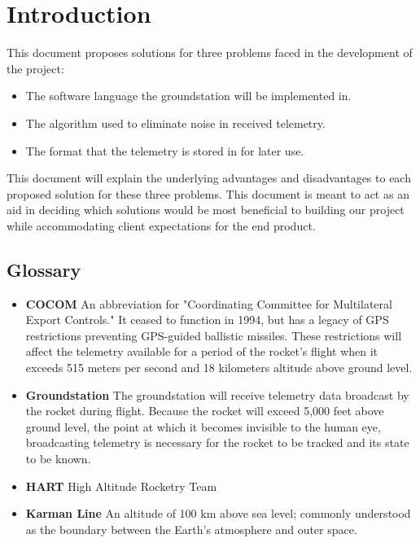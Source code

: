 \documentclass[onecolumn, draftclsnofoot,10pt, compsoc]{IEEEtran}
\begin{document}
	\newpage
	\tableofcontents
	\newpage


	\section{Introduction}
		\noindent
		This document proposes solutions for three problems faced in the development of the project:
		
		\begin{itemize}
			\item The software language the groundstation will be implemented in.
			\item The algorithm used to eliminate noise in received telemetry.
			\item The format that the telemetry is stored in for later use.
		\end{itemize}
		
		This document will explain the underlying advantages and disadvantages to each proposed solution for these three problems.
		This document is meant to act as an aid in deciding which solutions would be most beneficial to building our project while accommodating client expectations for the end product.
		

		\subsection{Glossary}
			\begin{itemize}
				\item \textbf{COCOM}\cite{COCOM}
					An abbreviation for "Coordinating Committee for Multilateral Export Controls."
					It ceased to function in 1994, but has a legacy of GPS restrictions preventing GPS-guided ballistic missiles.
					These restrictions will affect the telemetry available for a period of the rocket's flight when it exceeds 515 meters per second and 18 kilometers altitude above ground level.
				\item \textbf{Groundstation}
					The groundstation will receive telemetry data broadcast by the rocket during flight.
					Because the rocket will exceed 5,000 feet above ground level, the point at which it becomes invisible to the human eye, broadcasting telemetry is necessary for the rocket to be tracked and its state to be known.
				\item \textbf{HART}
					High Altitude Rocketry Team
				\item \textbf{Karman Line}
					An altitude of 100 km above sea level; commonly understood as the boundary between the Earth's atmosphere and outer space.
			\end{itemize}
\end{document}
